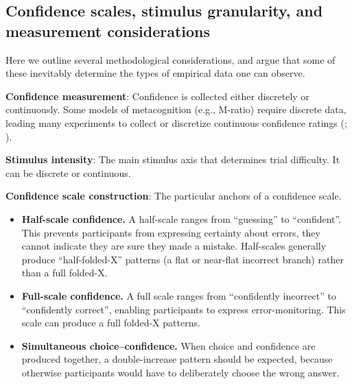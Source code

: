 \documentclass[
]{article}
\begin{document}
\subsection{Confidence scales, stimulus granularity, and measurement
considerations}\label{confidence-scales-stimulus-granularity-and-measurement-considerations}

Here we outline several methodological considerations, and argue that
some of these inevitably determine the types of empirical data one can
observe.

\textbf{Confidence measurement}: Confidence is collected either
discretely or continuously. Some models of metacognition (e.g., M-ratio)
require discrete data, leading many experiments to collect or discretize
continuous confidence ratings
(;
).

\textbf{Stimulus intensity}: The main stimulus axis that determines
trial difficulty. It can be discrete or continuous.

\textbf{Confidence scale construction}: The particular anchors of a
confidence scale.

\begin{itemize}
\item
  \textbf{Half-scale confidence.} A half-scale ranges from ``guessing''
  to ``confident''. This prevents participants from expressing certainty
  about errors, they cannot indicate they are sure they made a mistake.
  Half-scales generally produce ``half-folded-X'' patterns (a flat or
  near-flat incorrect branch) rather than a full folded-X.
\item
  \textbf{Full-scale confidence.} A full scale ranges from ``confidently
  incorrect'' to ``confidently correct'', enabling participants to
  express error-monitoring. This scale can produce a full folded-X
  patterns.
\item
  \textbf{Simultaneous choice--confidence.} When choice and confidence
  are produced together, a double-increase pattern should be expected,
  because otherwise participants would have to deliberately choose the
  wrong answer.
\end{itemize}
\end{document}
